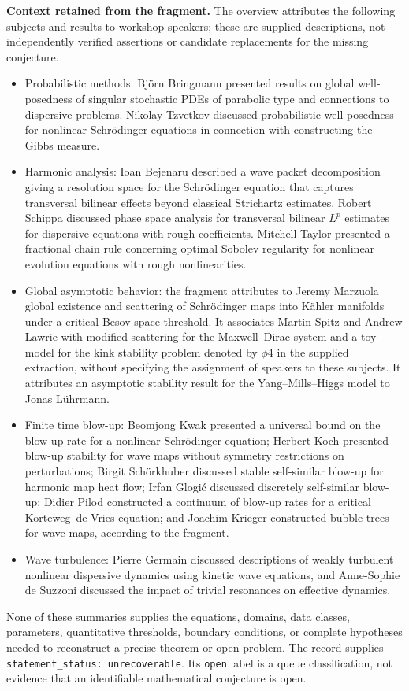 \documentclass[11pt]{article}
\begin{document}
\textbf{Context retained from the fragment.} The overview attributes the following subjects and results to workshop speakers; these are supplied descriptions, not independently verified assertions or candidate replacements for the missing conjecture.
\begin{itemize}
\item Probabilistic methods: Björn Bringmann presented results on global well-posedness of singular stochastic PDEs of parabolic type and connections to dispersive problems. Nikolay Tzvetkov discussed probabilistic well-posedness for nonlinear Schrödinger equations in connection with constructing the Gibbs measure.
\item Harmonic analysis: Ioan Bejenaru described a wave packet decomposition giving a resolution space for the Schrödinger equation that captures transversal bilinear effects beyond classical Strichartz estimates. Robert Schippa discussed phase space analysis for transversal bilinear \(L^p\) estimates for dispersive equations with rough coefficients. Mitchell Taylor presented a fractional chain rule concerning optimal Sobolev regularity for nonlinear evolution equations with rough nonlinearities.
\item Global asymptotic behavior: the fragment attributes to Jeremy Marzuola global existence and scattering of Schrödinger maps into Kähler manifolds under a critical Besov space threshold. It associates Martin Spitz and Andrew Lawrie with modified scattering for the Maxwell--Dirac system and a toy model for the kink stability problem denoted by \(\phi4\) in the supplied extraction, without specifying the assignment of speakers to these subjects. It attributes an asymptotic stability result for the Yang--Mills--Higgs model to Jonas Lührmann.
\item Finite time blow-up: Beomjong Kwak presented a universal bound on the blow-up rate for a nonlinear Schrödinger equation; Herbert Koch presented blow-up stability for wave maps without symmetry restrictions on perturbations; Birgit Schörkhuber discussed stable self-similar blow-up for harmonic map heat flow; Irfan Glogić discussed discretely self-similar blow-up; Didier Pilod constructed a continuum of blow-up rates for a critical Korteweg--de Vries equation; and Joachim Krieger constructed bubble trees for wave maps, according to the fragment.
\item Wave turbulence: Pierre Germain discussed descriptions of weakly turbulent nonlinear dispersive dynamics using kinetic wave equations, and Anne-Sophie de Suzzoni discussed the impact of trivial resonances on effective dynamics.
\end{itemize}
None of these summaries supplies the equations, domains, data classes, parameters, quantitative thresholds, boundary conditions, or complete hypotheses needed to reconstruct a precise theorem or open problem. The record supplies \texttt{statement\_status: unrecoverable}. Its \texttt{open} label is a queue classification, not evidence that an identifiable mathematical conjecture is open.
\end{document}
